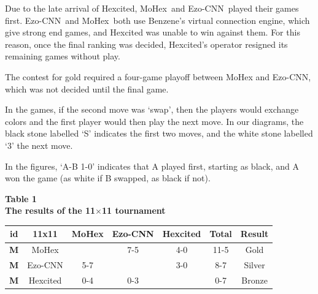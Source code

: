 \documentclass{icga}
\newif\iflong\longtrue  %
\def\Ec{\mbox{\sc Ezo-CNN}}
\def\Hite{\mbox{\sc Hexcited}}
\def\Mx{\mbox{\sc MoHex}}
\begin{document}
Due to the late arrival of \Hite,
\Mx\ and \Ec\ played their games first.
\Ec\ and \Mx\ both use Benzene's virtual connection engine,
which give strong end games, and \Hite{} was unable to win against them.
For this reason, once the final ranking was decided,
\Hite's operator resigned its remaining games without play.

The contest for gold required a four-game playoff between \Mx{} and \Ec{},
which was not decided until the final game.

In the games, if the second move was `swap', then the players would
exchange colors and the first player would then play the next move.
In our diagrams, the black stone labelled `S' indicates the first two moves,
and the white stone labelled `3' the next move.

In the figures, `A-B 1-0' indicates that A played first,
starting as black, and A won the game 
(as white if B swapped, as black if not).

\begin{center}
{\bf
Table 1 \\
The results of the 11$\times$11 tournament
}

\begin{tabular}{|c|c|c|c|c|c|c|}
\hline {\bf id} & {\bf 11x11} &\Mx{} &\Ec{}  & \Hite{}  
                & {\bf Total} & {\bf Result} \\ 
\hline {\bf M} & \Mx{}         &      &  7-5  &  4-0   & 11-5  &  Gold \\
\hline {\bf M} & \Ec{}         &  5-7 &       &  3-0   & 8-7   &  Silver \\
\hline {\bf M} & \Hite{}       &  0-4 &  0-3  &        & 0-7   &  Bronze \\
\hline
\end{tabular}
\end{center}

\iflong

\end{document}
